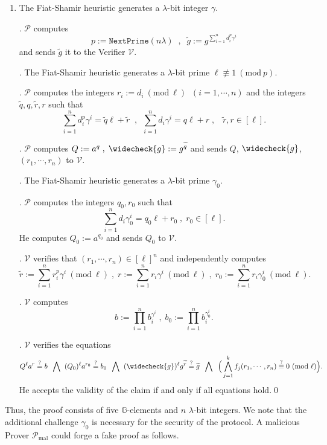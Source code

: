 \documentclass[11pt, lettersize, notitlepage, leqno, footskip=0.6cm]{article}
\newcommand{\pl}{\prod\limits}
\newcommand{\slim}{\sum\limits}
\newcommand{\ttt}{\texttt}
\newcommand{\wti}{\widetilde}
\newcommand{\mc}{\mathcal}
\newcommand{\mb}{\mathbb}
\newcommand{\mr}{\mathrm}
\newcommand{\lam}{\lambda}
\newcommand{\weck}{\widecheck}
\newcommand{\mP}{\mc{P}}
\newcommand{\V}{\mc{V}}
\newcommand{\vs}{\vspace{-0.15cm}}
\newcommand{\noin}{\noindent}
\newcommand{\sta}{\stackrel{?}{=}}
\newcommand{\Mod}[1]{\ (\mathrm{mod}\ #1)}
\numberwithin{equation}{section}
\begin{document}
\begin{enumerate}[wide, labelwidth=!, labelindent=0pt]\vs \item The Fiat-Shamir heuristic generates a $\lam$-bit integer $\gamma$.

. $\mc{P}$ computes \vs $$p:= \ttt{NextPrime}(n\lam)\;\;,\;\;\wti{g} :=g^{\sum\limits_{i=1}^n d_i^{p}\gamma^i}$$ and sends $\wti{g}$ it to the Verifier $\mc{V}$.

. The Fiat-Shamir heuristic generates a $\lam$-bit prime $\ell\not\equiv 1\Mod{p}$.
 
. $\mc{P}$ computes the integers $r_i:=d_i\Mod{\ell}\;\; (i=1,\cdots, n)$ and the integers $\wti{q}, q, \wti{r}, r$ such that \vs $$\slim_{i=1}^n d_i^{p}\gamma^i = \wti{q}\ell+\wti{r}\;\;,\:\;\slim_{i=1}^n d_i\gamma^i = q\ell+r\;,\;\;\;\wti{r}, r\in [\ell] .$$

\noin 5. $\mP$ computes $Q:= a^q\;,\;\weck{g}:= g^{\wti{q}}$ and sends $Q$, $\weck{g}$, $(r_1,\cdots,r_n)$ to  $\V$. 

\noin 6. The Fiat-Shamir heuristic generates a $\lam$-bit prime $\gamma_0$.

\noin 7. $\mP$ computes the integers $q_0, r_0$ such that \vs $$\slim_{i=1}^n d_i\gamma_0^i = q_0\ell+r_0\;,\;r_0\in[\ell] .$$ He computes $Q_0:= a^{q_{0}}$ and sends $Q_0$ to $\V$.

. $\mc{V}$ verifies that $(r_1,\cdots,r_n)\in [\ell]^n$ and independently computes \vs $$\wti{r}:= \slim_{i=1}^n r_i^{p}\gamma^i\Mod{\ell}\;,\;r:= \slim_{i=1}^n r_i\gamma^i\Mod{\ell}\;,\;r_0:= \slim_{i=1}^n r_i\gamma_0^i\Mod{\ell}.$$

\noin 9. $\V$ computes \vs $$b:= \pl_{i=1}^n b_i^{\gamma^i}\;,\;b_0:= \pl_{i=1}^n b_i^{\gamma_0^i}.$$

. $\mc{V}$ verifies the equations \vs $$ Q^{\ell} a^{r} \sta b \;\;\bigwedge\;\;(Q_0)^{\ell} a^{r_{0}} \sta b_0 \;\;\bigwedge\;\; (\weck{g})^{\ell}g^{\wti{r}} \stackrel{?}{=}\wti{g} \;\;\bigwedge\;\;\Big( \bigwedge\limits_{j=1}^k  f_j(r_1,\cdots,r_n) \stackrel{?}{\equiv} 0\Mod{\ell} \Big).$$ He accepts the validity of the claim if and only if all equations hold.\qed \end{enumerate}


\vspace{0.1cm}

Thus, the proof consists of five $\mb{G}$-elements and $n$ $\lam$-bit integers. We note that the additional challenge $\gamma_0$ is necessary for the security of the protocol. A malicious Prover $\mP_{\mr{mal}}$ could forge a fake proof as follows.
\end{document}
